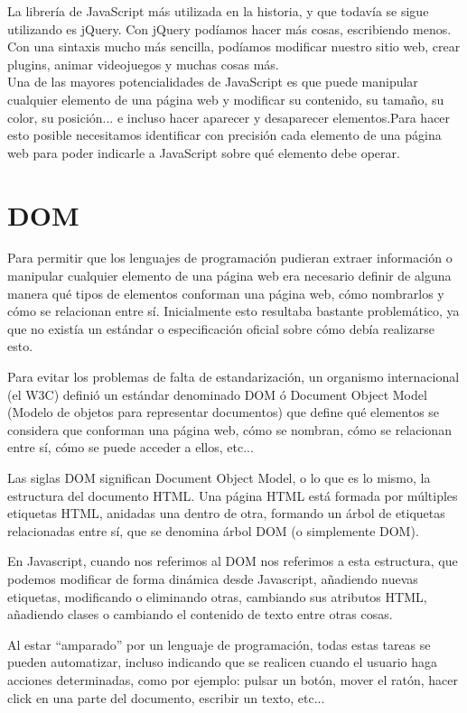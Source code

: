 \documentclass[a4paper, 12pt]{book}
\begin{document}
La librería de JavaScript más utilizada en la historia, y que todavía se sigue utilizando es jQuery. Con jQuery podíamos hacer más cosas, escribiendo menos. Con una sintaxis mucho más sencilla, podíamos modificar nuestro sitio web, crear plugins, animar videojuegos y muchas cosas más.
\\

Una de las mayores potencialidades de JavaScript es que puede manipular cualquier elemento de una página web y modificar su contenido, su tamaño, su color, su posición... e incluso hacer aparecer y desaparecer elementos.Para hacer esto posible necesitamos identificar con precisión cada elemento de una página web para poder indicarle a JavaScript sobre qué elemento debe operar.


\section{DOM} 
\label{sec:DOM}
Para permitir que los lenguajes de programación pudieran extraer información o manipular cualquier elemento de una página web era necesario definir de alguna manera qué tipos de elementos conforman una página web, cómo nombrarlos y cómo se relacionan entre sí. Inicialmente esto resultaba bastante problemático, ya que no existía un estándar o especificación oficial sobre cómo debía realizarse esto.

Para evitar los problemas de falta de estandarización, un organismo internacional (el W3C) definió un estándar denominado DOM ó Document Object Model (Modelo de objetos para representar documentos) que define qué elementos se considera que conforman una página web, cómo se nombran, cómo se relacionan entre sí, cómo se puede acceder a ellos, etc...

Las siglas DOM significan Document Object Model, o lo que es lo mismo, la estructura del documento HTML. Una página HTML está formada por múltiples etiquetas HTML, anidadas una dentro de otra, formando un árbol de etiquetas relacionadas entre sí, que se denomina árbol DOM (o simplemente DOM).

En Javascript, cuando nos referimos al DOM nos referimos a esta estructura, que podemos modificar de forma dinámica desde Javascript, añadiendo nuevas etiquetas, modificando o eliminando otras, cambiando sus atributos HTML, añadiendo clases o cambiando el contenido de texto entre otras cosas.


Al estar “amparado” por un lenguaje de programación, todas estas tareas se pueden automatizar, incluso indicando que se realicen cuando el usuario haga acciones determinadas, como por ejemplo: pulsar un botón, mover el ratón, hacer click en una parte del documento, escribir un texto, etc...
\end{document}
